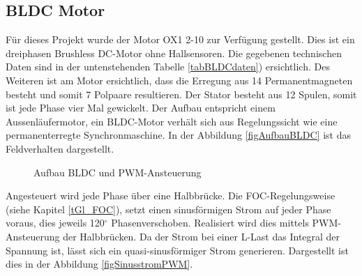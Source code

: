 \subsection{BLDC Motor}
\label{tGl_BLDC}

Für dieses Projekt wurde der Motor OX1 2-10 zur Verfügung gestellt. Dies ist ein dreiphasen Brushless DC-Motor ohne Hallsensoren. Die gegebenen technischen Daten sind in der untenstehenden Tabelle \ref{tabBLDCdaten}) ersichtlich. 
Des Weiteren ist am Motor ersichtlich, dass die Erregung aus 14 Permanentmagneten besteht und somit 7 Polpaare resultieren. Der Stator besteht aus 12 Spulen, somit ist jede Phase vier Mal gewickelt.
Der Aufbau entspricht einem Aussenläufermotor, ein BLDC-Motor verhält sich aus Regelungssicht wie eine permanenterregte Synchronmaschine. In der Abbildung \ref{figAufbauBLDC} ist das Feldverhalten dargestellt.\\

\begin{figure} [H]
{}
\caption[BLDC Motor]{Aufbau BLDC und PWM-Ansteuerung}
\label{fig:BLDC}
\end{figure}

Angesteuert wird jede Phase über eine Halbbrücke. Die FOC-Regelungsweise (siehe Kapitel \ref{tGl_FOC}), setzt einen sinusförmigen Strom auf jeder Phase voraus, dies jeweils 120\(^\circ\) Phasenverschoben.  Realisiert wird dies mittels PWM-Ansteuerung der Halbbrücken. Da der Strom bei einer L-Last das Integral der Spannung ist, lässt sich ein quasi-sinusförmiger Strom generieren. Dargestellt ist dies in der Abbildung \ref{figSinusstromPWM}.

